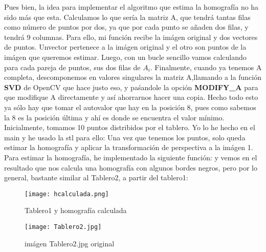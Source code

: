 Pues bien, la idea para implementar el algoritmo que estima la homografía no ha sido más que esta. Calculamos
lo que sería la matriz A, que tendrá tantas filas como número de puntos por dos, ya que por cada punto se añaden dos filas,
y tendrá 9 columnas. \newline
Para ello, mi función recibe la imágen original y dos vectores de puntos. Unvector pertenece a la imágen original y el otro son puntos
de la imágen que queremos estimar. \newline
 Luego, con un bucle sencillo vamos calculando para cada pareja de puntos, sus dos filas de $A_{i}$. Finalmente, cuando
ya tenemos A completa, descomponemos en valores singulares la matriz A,llamando a la función \textbf{SVD} de OpenCV que hace justo eso,
y paśandole la opción \textbf{MODIFY\_A} para que modifique A directamente y así ahorrarnos hacer una copia. \newline
Hecho todo esto ya sólo hay que tomar el autovalor que hay en la posición 8, pues como sabemos
la 8 es la posición última y ahí es donde se encuentra el valor mínimo. \newline
Inicialmente, tomamos 10 puntos distribidos por el tablero. Yo lo he hecho en el main y he usado la stl para ello:
Una vez que tenemos los puntos, solo queda estimar la homografía y aplicar la transformación de perspectiva a la imágen 1.
Para estimar la homografía, he implementado la siguiente función:
y vemos en el resultado que nos calcula una homografía con algunos bordes negros, pero por lo general, bastante similar al Tablero2, a partir
del tablero1:
\begin{figure}[H] %
\centering
\texttt{[image: hcalculada.png]}  %
\label{figura1}
\caption{Tablero1 y homografía calculada  }
\end{figure}

\begin{figure}[H] %
\centering
\texttt{[image: Tablero2.jpg]}  %
\label{figura1}
\caption{imágen Tablero2.jpg original}
\end{figure}
